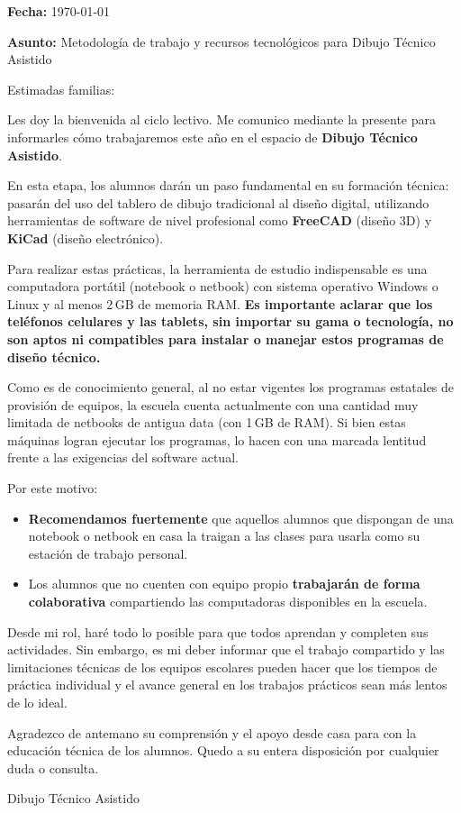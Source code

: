 \documentclass[13pt,a4paper]{article}
\begin{document}
\begin{flushright}
\textbf{Fecha:} \today
\end{flushright}

\vspace{0.5cm}

\textbf{Asunto:} Metodología de trabajo y recursos tecnológicos para Dibujo Técnico Asistido

\vspace{0.5cm}

Estimadas familias:

Les doy la bienvenida al ciclo lectivo. Me comunico mediante la presente para informarles cómo trabajaremos este año en el espacio de \textbf{Dibujo Técnico Asistido}.

En esta etapa, los alumnos darán un paso fundamental en su formación técnica: pasarán del uso del tablero de dibujo tradicional al diseño digital, utilizando herramientas de software de nivel profesional como \textbf{FreeCAD} (diseño 3D) y \textbf{KiCad} (diseño electrónico).

Para realizar estas prácticas, la herramienta de estudio indispensable es una computadora portátil (notebook o netbook) con sistema operativo Windows o Linux y al menos 2\,GB de memoria RAM. \textbf{Es importante aclarar que los teléfonos celulares y las tablets, sin importar su gama o tecnología, no son aptos ni compatibles para instalar o manejar estos programas de diseño técnico.}

Como es de conocimiento general, al no estar vigentes los programas estatales de provisión de equipos, la escuela cuenta actualmente con una cantidad muy limitada de netbooks de antigua data (con 1\,GB de RAM). Si bien estas máquinas logran ejecutar los programas, lo hacen con una marcada lentitud frente a las exigencias del software actual.

Por este motivo:
\begin{itemize}[itemsep=2pt, parsep=0pt]
    \item \textbf{Recomendamos fuertemente} que aquellos alumnos que dispongan de una notebook o netbook en casa la traigan a las clases para usarla como su estación de trabajo personal.
    \item Los alumnos que no cuenten con equipo propio \textbf{trabajarán de forma colaborativa} compartiendo las computadoras disponibles en la escuela.
\end{itemize}

Desde mi rol, haré todo lo posible para que todos aprendan y completen sus actividades. Sin embargo, es mi deber informar que el trabajo compartido y las limitaciones técnicas de los equipos escolares pueden hacer que los tiempos de práctica individual y el avance general en los trabajos prácticos sean más lentos de lo ideal.

Agradezco de antemano su comprensión y el apoyo desde casa para con la educación técnica de los alumnos. Quedo a su entera disposición por cualquier duda o consulta.

\vspace{2cm}

\begin{flushleft}
Dibujo Técnico Asistido
\end{flushleft}
\end{document}
